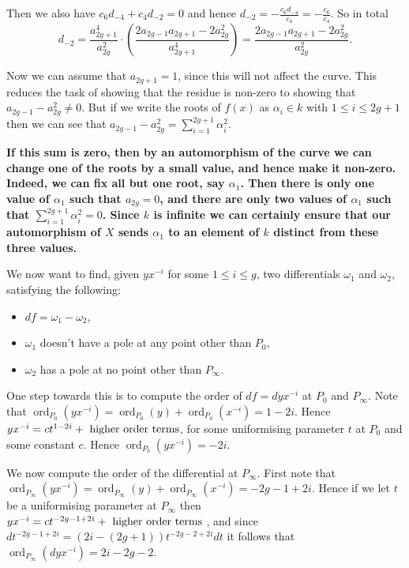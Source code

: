\documentclass[draft, 11pt]{article} %
\theoremstyle{plain}
\theoremstyle{remark}
\DeclareMathOperator{\ord}{ord}
\begin{document}
Then we also have $c_6d_{-4} + c_4d_{-2} = 0$ and hence $d_{-2} = -\frac{c_6d_{-4}}{c_4} = -\frac{c_6}{c_4}$.
So in total  
\[
d_{-2} = \frac{a_{2g+1}^4}{a_{2g}^2} \cdot \left( \frac{2a_{2g-1}a_{2g+1} - 2a_{2g}^2}{a_{2g+1}^4} \right) = \frac{2a_{2g-1}a_{2g+1} - 2a_{2g}^2}{a_{2g}^2}.
\]

Now we can assume that $a_{2g+1} = 1$, since this will not affect the curve.
This reduces the task of showing that the residue is non-zero to showing that $a_{2g-1} -a_{2g}^2 \neq 0$.
But if we write the roots of $f(x)$ as $\alpha_i \in k$ with $1\leq i \leq 2g+1$ then we can see that $a_{2g-1} -a_{2g}^2 = \sum_{i=1}^{2g+1}\alpha_i^2$.
 
{\bf If this sum is zero, then by an automorphism of the curve we can change one of the roots by a small value, and hence make it non-zero. 
Indeed, we can fix all but one root, say $\alpha_1$. Then there is only one value of $\alpha_1$ such that $a_{2g}=0$, and there are only two values of $\alpha_1$ such that $\sum_{i=1}^{2g+1}\alpha_i^2 = 0$. Since $k$ is infinite we can certainly ensure that our automorphism of $X$ sends $\alpha_1$ to an element of $k$ distinct from these three values.}


We now want to find, given $yx^{-i}$ for some $1\leq i \leq g$, two differentials $\omega_1$ and $\omega_2$, satisfying the following:
\begin{itemize}
	\item $df = \omega_1 - \omega_2$,
	\item $\omega_1$ doesn't have a pole at any point other than $P_0$,
	\item $\omega_2$ has a pole at no point other than $P_\infty$.
\end{itemize}

One step towards this is to compute the order of $df = dyx^{-i}$ at $P_0$ and $P_\infty$.
Note that $\ord_{P_0}(yx^{-i}) = \ord_{P_0}(y) + \ord_{P_0}(x^{-i}) = 1 -2i$.
Hence $yx^{-i} = ct^{1-2i} + {\rm \ higher \ order \ terms }$, for some uniformising parameter $t$ at $P_0$ and some constant $c$.
Hence $\ord_{P_0}(yx^{-i}) = -2i$.

We now compute the order of the differential at $P_\infty$.
First note that $\ord_{P_\infty}(yx^{-i})= \ord_{P_\infty}(y) + \ord_{P_\infty}(x^{-i}) = -2g-1+2i.$
Hence if we let $t$ be a uniformising parameter at $P_\infty$ then $yx^{-i} = ct^{-2g-1+2i} + {\rm \ higher \ order \ terms \ }$, and since $dt^{-2g-1+2i} = (2i-(2g+1)) t^{-2g-2+2i}dt$ it follows that $\ord_{P_\infty}(dyx^{-i}) = 2i-2g-2$.
\end{document}
